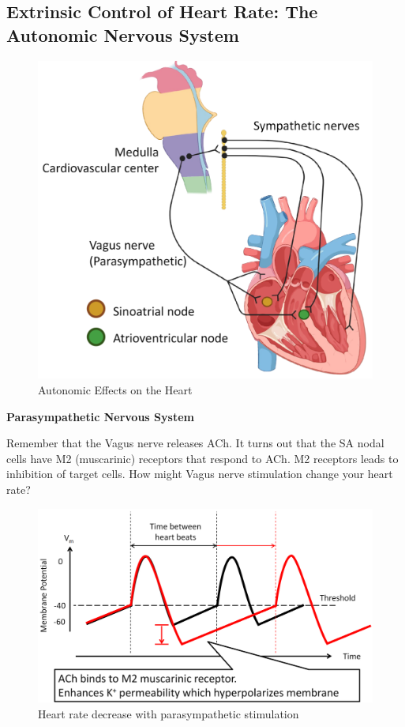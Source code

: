 \documentclass[11pt,fleqn]{book}
\begin{document}
\subsection{Extrinsic Control of Heart Rate: The Autonomic Nervous System}

\begin{figure}[h!]
\begin{center}
    \includegraphics[width=0.6\linewidth]{Pictures/Screenshot 2024-04-04 004942.png}
\end{center}
    \caption{Autonomic Effects on the Heart}
\end{figure}

\textbf{Parasympathetic Nervous System}

\begin{exercise}
Remember that the Vagus nerve releases ACh.
It turns out that the SA nodal cells have M2
(muscarinic) receptors that respond to ACh. M2
receptors leads to inhibition of target cells.
How might Vagus nerve stimulation change
your heart rate?
\end{exercise}


\begin{figure}[h!]
\begin{center}
    \includegraphics[width=0.6\linewidth]{Pictures/Screenshot 2024-04-04 011648.png}
\end{center}
    \caption{Heart rate decrease with parasympathetic stimulation}
\end{figure}
\end{document}
